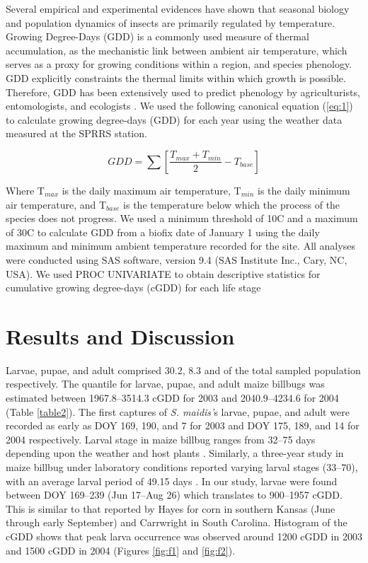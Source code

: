 \documentclass[agronomy,article,submit,moreauthors,pdftex,10pt,a4paper]{mdpi}
\theoremstyle{mdpi}
\newcounter{ex}
\newcounter{re}
\theoremstyle{mdpidefinition}
\begin{document}
Several empirical and experimental evidences have shown that seasonal biology and population dynamics of insects are primarily regulated by temperature. Growing Degree-Days (GDD) is a commonly used measure of thermal accumulation, as the mechanistic link between ambient air temperature, which serves as a proxy for growing conditions within a region, and species phenology. GDD explicitly constraints the thermal limits within which growth is possible. Therefore, GDD has been extensively used to predict phenology by agriculturists, entomologists, and ecologists \cite{higley86}. We used the following canonical equation (\ref{eq:1}) to calculate growing degree-days (GDD) for each year using the weather data measured at the SPRRS station.

\begin{equation}
\label{eq:1}
GDD= \sum \left [ \frac{T_{max}+T_{min}}{2} -T_{base}\right ]
\end{equation}

Where T$_{max}$ is the daily maximum air temperature, T$_{min}$ is the daily minimum air temperature, and T$_{base}$ is the temperature below which the process of the species does not progress. We used a minimum threshold of 10\degree C and a maximum of 30\degree C to calculate GDD from a biofix date of January 1 using the daily maximum and minimum ambient temperature recorded for the site. All analyses were conducted using SAS software, version 9.4 (SAS Institute Inc., Cary, NC, USA). We used PROC UNIVARIATE to obtain descriptive statistics for cumulative growing degree-days (cGDD) for each life stage 




\section{Results and Discussion}

Larvae, pupae, and adult comprised 30.2, 8.3 and  of the total sampled population respectively. The  quantile for larvae, pupae, and adult maize billbugs was estimated between 1967.8–3514.3 cGDD for 2003 and 2040.9–4234.6 for 2004 (Table \ref{table2}). The first captures of \textit{S. maidis’}s larvae, pupae, and adult were recorded as early as DOY 169, 190, and 7 for 2003 and DOY 175, 189, and 14 for 2004 respectively. Larval stage in maize billbug ranges from 32–75 days depending upon the weather and host plants \cite{hayes1916}. Similarly, a three-year study in maize billbug under laboratory conditions reported varying larval stages (33–70), with an average larval period of 49.15 days \cite{cwright1929}. In our study, larvae were found between DOY 169–239 (Jun 17–Aug 26) which translates to 900–1957 cGDD. This is similar to that reported by Hayes \cite{hayes1916} for corn in southern Kansas (June through early September) and Carrwright \cite{cwright1929} in South Carolina. Histogram of the cGDD shows that peak larva occurrence was observed around 1200 cGDD in 2003 and 1500 cGDD in 2004 (Figures \ref{fig:f1} and \ref{fig:f2}). 
\end{document}
